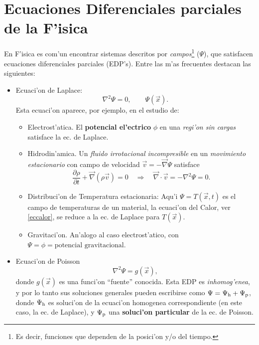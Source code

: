 \chapter{Ecuaciones Diferenciales parciales de la F'isica}

En F'isica es com'un encontrar sistemas descritos por \textit{campos}\footnote{Es decir, funciones que dependen de la posici'on y/o del tiempo.} ($\Psi$), que satisfacen ecuaciones diferenciales parciales (EDP's). Entre las m'as
frecuentes destacan las siguientes:
\begin{itemize}
\item Ecuaci'on de Laplace: 
\begin{equation}
\nabla^2\Psi=0, \qquad \Psi(\vec{x}).
\end{equation}
 Esta ecuaci'on aparece, por ejemplo, en el estudio de:
	\begin{itemize}
	\item Electrost'atica. El \textbf{potencial el'ectrico} $\phi$ en una \textit{regi'on sin cargas} satisface la ec. de Laplace.
	\item Hidrodin'amica. Un \textit{fluido irrotacional incompresible} en un \textit{movimiento estacionario} con campo de velocidad $\vec{v}=-\vec\nabla\Psi$ satisface
	\begin{equation}
	\frac{\partial\rho}{\partial t}+\vec\nabla (\rho\vec{v})=0 \quad\Rightarrow\quad
	\vec\nabla\cdot\vec{v}=-\nabla^2\Psi=0.
	\end{equation}
	\item Distribuci'on de Temperatura estacionaria: Aqu'i $\Psi=T(\vec{x},t)$ es el campo de temperaturas de un material, la ecuaci'on del Calor, ver \eqref{eccalor},  se reduce a la ec. de Laplace para $T(\vec{x})$.
	\item Gravitaci'on. An'alogo al caso electrost'atico, con $\Psi=\phi=\text{potencial gravitacional}$.
	\end{itemize}
\item Ecuaci'on de Poisson
\begin{equation}
\nabla^2\Psi=g(\vec{x}),
\end{equation}
donde $g(\vec{x})$ es una funci'on ``fuente'' conocida. Esta EDP es \textit{inhomog'enea}, y por lo tanto sus soluciones generales pueden escribirse como $\Psi=\Psi_{\rm h}+\Psi_{\rm p}$, donde $\Psi_{\rm h}$ es soluci'on de la ecuaci'on homogenea correspondiente (en este caso, la ec. de Laplace), y $\Psi_{\rm p}$ una \textbf{soluci'on particular} de la ec. de Poisson.


\end{itemize}
